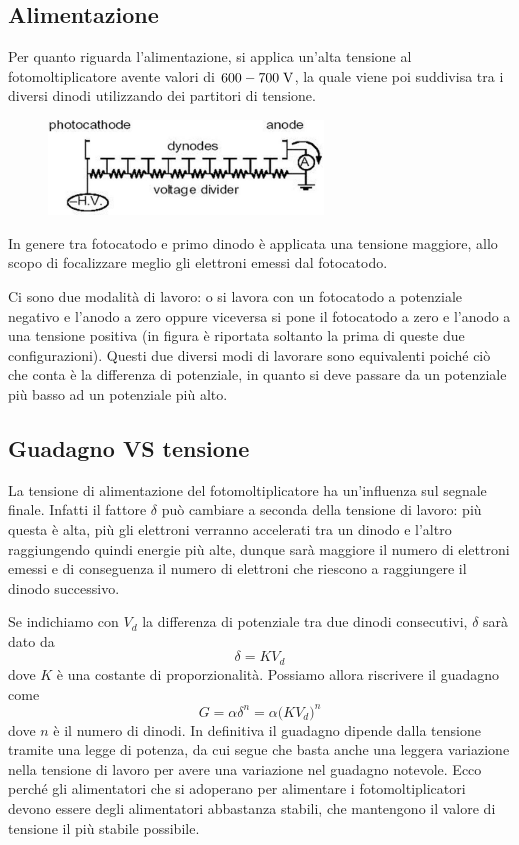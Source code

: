\subsection{Alimentazione}
Per quanto riguarda l'alimentazione, si applica un'alta tensione al fotomoltiplicatore avente valori di $600-700 \rm \; V$, la quale viene poi suddivisa tra i diversi dinodi utilizzando dei partitori di tensione.
\begin{figure}[H]
   \centering
   \includegraphics[width=0.65\textwidth]{immagini/partitore_tensione.png}
\end{figure}
In genere tra fotocatodo e primo dinodo è applicata una tensione maggiore, allo scopo di focalizzare meglio gli elettroni emessi dal fotocatodo.

Ci sono due modalità di lavoro: o si lavora con un fotocatodo a potenziale negativo e l'anodo a zero oppure viceversa si pone il fotocatodo a zero e l'anodo a una tensione positiva (in figura è riportata soltanto la prima di queste due configurazioni). Questi due diversi modi di lavorare sono equivalenti poiché ciò che conta è la differenza di potenziale, in quanto si deve passare da un potenziale più basso ad un potenziale più alto.
\subsection{Guadagno VS tensione}
La tensione di alimentazione del fotomoltiplicatore ha un'influenza sul segnale finale. Infatti il fattore $\delta$ può cambiare a seconda della tensione di lavoro: più questa è alta, più gli elettroni verranno accelerati tra un dinodo e l'altro raggiungendo quindi energie più alte, dunque sarà maggiore il numero di elettroni emessi e di conseguenza il numero di elettroni che riescono a raggiungere il dinodo successivo.

Se indichiamo con $V_d$ la differenza di potenziale tra due dinodi consecutivi, $\delta$ sarà dato da
\begin{equation*}
   \delta=K V_d
\end{equation*}
dove $K$ è una costante di proporzionalità. Possiamo allora riscrivere il guadagno come
\begin{equation*}
   G=\alpha \delta^n
   =\alpha \bigl( KV_d \bigr)^n
\end{equation*}
dove $n$ è il numero di dinodi. In definitiva il guadagno dipende dalla tensione tramite una legge di potenza, da cui segue che basta anche una leggera variazione nella tensione di lavoro per avere una variazione nel guadagno notevole. Ecco perché gli alimentatori che si adoperano per alimentare i fotomoltiplicatori devono essere degli alimentatori abbastanza stabili, che mantengono il valore di tensione il più stabile possibile.

